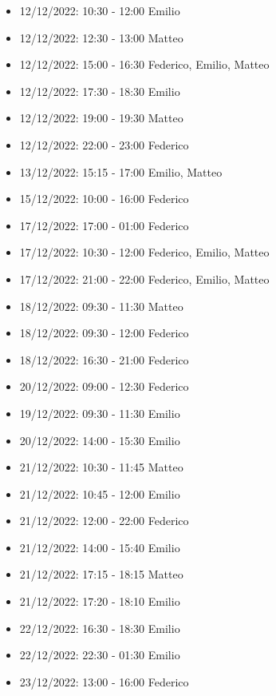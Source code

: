 \begin{itemize}
    \item 12/12/2022: 10:30 - 12:00 Emilio
    \item 12/12/2022: 12:30 - 13:00 Matteo
    \item 12/12/2022: 15:00 - 16:30 Federico, Emilio, Matteo
    \item 12/12/2022: 17:30 - 18:30 Emilio
    \item 12/12/2022: 19:00 - 19:30 Matteo
    \item 12/12/2022: 22:00 - 23:00 Federico
    \item 13/12/2022: 15:15 - 17:00 Emilio, Matteo
    \item 15/12/2022: 10:00 - 16:00 Federico
    \item 17/12/2022: 17:00 - 01:00 Federico
    \item 17/12/2022: 10:30 - 12:00 Federico, Emilio, Matteo
    \item 17/12/2022: 21:00 - 22:00 Federico, Emilio, Matteo
    \item 18/12/2022: 09:30 - 11:30 Matteo
    \item 18/12/2022: 09:30 - 12:00 Federico
    \item 18/12/2022: 16:30 - 21:00 Federico
    \item 20/12/2022: 09:00 - 12:30 Federico
    \item 19/12/2022: 09:30 - 11:30 Emilio
    \item 20/12/2022: 14:00 - 15:30 Emilio
    \item 21/12/2022: 10:30 - 11:45 Matteo
    \item 21/12/2022: 10:45 - 12:00 Emilio
    \item 21/12/2022: 12:00 - 22:00 Federico
    \item 21/12/2022: 14:00 - 15:40 Emilio
    \item 21/12/2022: 17:15 - 18:15 Matteo
    \item 21/12/2022: 17:20 - 18:10 Emilio
    \item 22/12/2022: 16:30 - 18:30 Emilio
    \item 22/12/2022: 22:30 - 01:30 Emilio
    \item 23/12/2022: 13:00 - 16:00 Federico
\end{itemize}